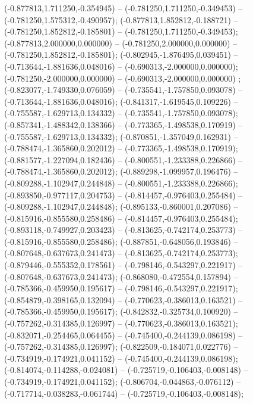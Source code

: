  (-0.877813,1.711250,-0.354945) -- (-0.781250,1.711250,-0.349453) -- (-0.781250,1.575312,-0.490957);
 (-0.877813,1.852812,-0.188721) -- (-0.781250,1.852812,-0.185801) -- (-0.781250,1.711250,-0.349453);
 (-0.877813,2.000000,0.000000) -- (-0.781250,2.000000,0.000000) -- (-0.781250,1.852812,-0.185801);
 (-0.802945,-1.876495,0.039451) -- (-0.713644,-1.881636,0.048016) -- (-0.690313,-2.000000,0.000000);
 (-0.781250,-2.000000,0.000000) -- (-0.690313,-2.000000,0.000000) ;
 (-0.823077,-1.749330,0.076059) -- (-0.735541,-1.757850,0.093078) -- (-0.713644,-1.881636,0.048016);
 (-0.841317,-1.619545,0.109226) -- (-0.755587,-1.629713,0.134332) -- (-0.735541,-1.757850,0.093078);
 (-0.857341,-1.488342,0.138366) -- (-0.773365,-1.498538,0.170919) -- (-0.755587,-1.629713,0.134332);
 (-0.870851,-1.357049,0.162931) -- (-0.788474,-1.365860,0.202012) -- (-0.773365,-1.498538,0.170919);
 (-0.881577,-1.227094,0.182436) -- (-0.800551,-1.233388,0.226866) -- (-0.788474,-1.365860,0.202012);
 (-0.889298,-1.099957,0.196476) -- (-0.809288,-1.102947,0.244848) -- (-0.800551,-1.233388,0.226866);
 (-0.893850,-0.977117,0.204753) -- (-0.814457,-0.976403,0.255484) -- (-0.809288,-1.102947,0.244848);
 (-0.895133,-0.860001,0.207086) -- (-0.815916,-0.855580,0.258486) -- (-0.814457,-0.976403,0.255484);
 (-0.893118,-0.749927,0.203423) -- (-0.813625,-0.742174,0.253773) -- (-0.815916,-0.855580,0.258486);
 (-0.887851,-0.648056,0.193846) -- (-0.807648,-0.637673,0.241473) -- (-0.813625,-0.742174,0.253773);
 (-0.879446,-0.555352,0.178561) -- (-0.798146,-0.543297,0.221917) -- (-0.807648,-0.637673,0.241473);
 (-0.868080,-0.472554,0.157894) -- (-0.785366,-0.459950,0.195617) -- (-0.798146,-0.543297,0.221917);
 (-0.854879,-0.398165,0.132094) -- (-0.770623,-0.386013,0.163521) -- (-0.785366,-0.459950,0.195617);
 (-0.842832,-0.325734,0.100920) -- (-0.757262,-0.314385,0.126997) -- (-0.770623,-0.386013,0.163521);
 (-0.832071,-0.254465,0.064455) -- (-0.745400,-0.244139,0.086198) -- (-0.757262,-0.314385,0.126997);
 (-0.822509,-0.184071,0.022776) -- (-0.734919,-0.174921,0.041152) -- (-0.745400,-0.244139,0.086198);
 (-0.814074,-0.114288,-0.024081) -- (-0.725719,-0.106403,-0.008148) -- (-0.734919,-0.174921,0.041152);
 (-0.806704,-0.044863,-0.076112) -- (-0.717714,-0.038283,-0.061744) -- (-0.725719,-0.106403,-0.008148);
